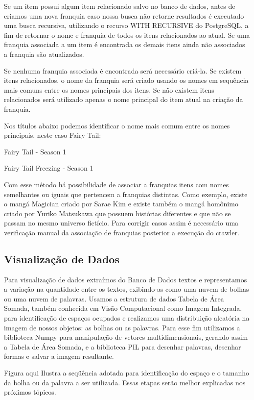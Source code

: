 \documentclass[12pt]{article}
\begin{document}
Se um item possui algum item relacionado salvo no banco de dados, antes de criamos uma nova franquia caso nossa busca não retorne resultados é executado uma busca recursiva, utilizando o recurso WITH RECURSIVE do PostgreSQL, a fim de retornar o nome e franquia de todos os itens relacionados ao atual. Se uma franquia associada a um item é encontrada os demais itens ainda não associados a franquia são atualizados.

Se nenhuma franquia associada é encontrada será necessário criá-la. Se existem itens relacionados, o nome da franquia será criado usando os nomes em sequência mais comuns entre os nomes principais dos itens. Se não existem itens relacionados será utilizado apenas o nome principal do item atual na criação da franquia.

Nos títulos abaixo podemos identificar o nome mais comum entre os nomes principais, neste caso Fairy Tail:
 
Fairy Tail - Season 1

Fairy Tail Freezing - Season 1 


Com esse método há possibilidade de associar a franquias itens com nomes semelhantes ou iguais que pertencem a franquias distintas. Como exemplo, existe o mangá Magician criado por Sarae Kim e existe também o mangá homônimo criado por Yuriko Matsukawa que possuem histórias diferentes e que não se passam no mesmo universo fictício. Para corrigir casos assim é necessário uma verificação manual da associação de franquias posterior a execução do crawler.

\subsection{Visualização de Dados}

Para visualização de dados extraímos do Banco de Dados textos e representamos a variação na quantidade entre os textos, exibindo-as como uma nuvem de bolhas ou uma nuvem de palavras. 
Usamos a estrutura de dados Tabela de Área Somada, também conhecida em Visão Computacional como Imagem Integrada, para identificação de espaços ocupados e realizamos uma distribuição aleatória na imagem de nossos objetos: as bolhas ou as palavras.
Para esse fim utilizamos a biblioteca Numpy para manipulação de vetores multidimensionais, gerando assim a Tabela de Área Somada, e a biblioteca PIL para desenhar palavras, desenhar formas e salvar a imagem resultante.

Figura aqui
Ilustra a seqüência adotada para identificação do espaço e o tamanho da bolha ou da palavra a ser utilizada. Essas etapas serão melhor explicadas nos próximos tópicos.   
\end{document}
